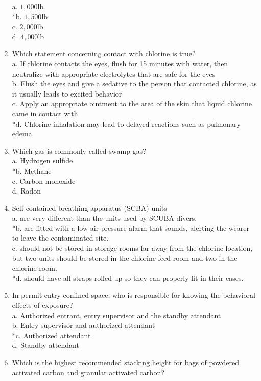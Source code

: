 \begin{enumerate}[1.]
a. $1,000 \mathrm{lb}$\\
*b. $1,500 \mathrm{lb}$\\
c. $2,000 \mathrm{lb}$\\
d. $4,000 \mathrm{lb}$\\
\item Which statement concerning contact with chlorine is true?\\
a. If chlorine contacts the eyes, flush for 15 minutes with water, then neutralize with appropriate electrolytes that are safe for the eyes\\
b. Flush the eyes and give a sedative to the person that contacted chlorine, as it usually leads to excited behavior\\
c. Apply an appropriate ointment to the area of the skin that liquid chlorine came in contact with\\
*d. Chlorine inhalation may lead to delayed reactions such as pulmonary edema\\
\item Which gas is commonly called swamp gas?\\
a. Hydrogen sulfide\\
*b. Methane\\
c. Carbon monoxide\\
d. Radon\\
\item Self-contained breathing apparatus (SCBA) units\\
a. are very different than the units used by SCUBA divers.\\
*b. are fitted with a low-air-pressure alarm that sounds, alerting the wearer to leave the contaminated site.\\
c. should not be stored in storage rooms far away from the chlorine location, but two units should be stored in the chlorine feed room and two in the chlorine room.\\
*d. should have all straps rolled up so they can properly fit in their cases.\\
\item In permit entry confined space, who is responsible for knowing the behavioral effects of exposure?\\
a. Authorized entrant, entry supervisor and the standby attendant\\
b. Entry supervisor and authorized attendant\\
*c. Authorized attendant\\
d. Standby attendant\\
\item Which is the highest recommended stacking height for bags of powdered activated carbon and granular activated carbon?\\

\end{enumerate}
